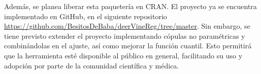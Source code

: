 Además, se planea liberar esta paquetería en CRAN. El proyecto ya se encuentra implementado en GitHub, en el siguiente repositorio \url{https://github.com/BesitosDeBaba/deerVineReg/tree/master}. Sin embargo, se tiene previsto extender el proyecto implementando cópulas no paramétricas y combinándolas en el ajuste, así como mejorar la función cuantil. Esto permitirá que la herramienta esté disponible al público en general, facilitando su uso y adopción por parte de la comunidad científica y médica.
